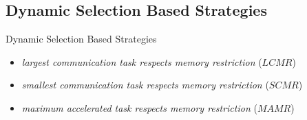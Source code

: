 \documentclass[mathserif,hyperref={pdfpagemode=FullScreen}]{beamer}
\begin{document}
\subsection{Dynamic Selection Based Strategies}
\begin{frame}{Dynamic Selection Based Strategies}
\begin{itemize}
	\vfill
	\item \textit{largest communication task respects memory restriction} ($LCMR$)
	\vfill
	\item \textit{smallest communication task respects memory restriction} ($SCMR$)
	\vfill
	\item \textit{maximum accelerated task respects memory restriction} ($MAMR$)
	\vfill
\end{itemize}
\end{frame}
\end{document}
